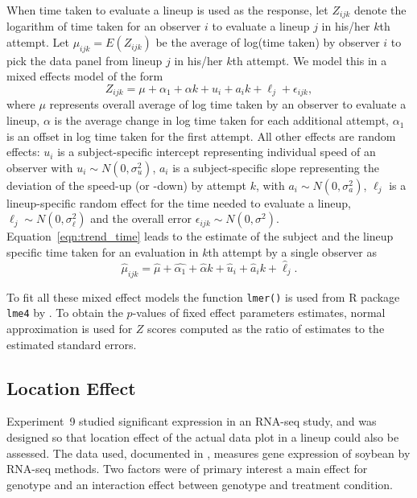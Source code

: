 \documentclass[10pt]{article}\usepackage[]{graphicx}\usepackage[]{color}
\newcommand{\hh}[1]{{\color{magenta} #1}}
\begin{document}
When time taken to evaluate a lineup is used as the response, let $Z_{ijk}$ denote the logarithm of time taken for an observer $i$ to evaluate a  lineup $j$ in his/her $k$th attempt. Let $\mu_{ijk}=  E(Z_{ijk})$ be the average of log(time taken) by  observer $i$ to pick the data panel from lineup $j$ in his/her $k$th attempt. We model this in a mixed effects model of the form
\begin{equation} \label{eqn:trend_time}
Z_{ijk} = \mu + \alpha_1 + \alpha k + u_i +  a_{i} k + \ell_j + \epsilon_{ijk},  
\end{equation}
where $\mu$ represents overall average of log time taken by an observer to evaluate a lineup, $\alpha$ is the average change in log time taken for each additional attempt,  $\alpha_1$ is an offset in log time taken for the first attempt. All other effects are random effects: $u_i$ is a subject-specific intercept representing individual speed of an observer with $u_i \sim N(0, \sigma_u^2)$, $a_i$ is a subject-specific slope representing the deviation of the speed-up (or -down) by attempt $k$, with $a_i \sim N(0, \sigma_a^2)$, $\ell_j$ is a lineup-specific random effect for the time needed to evaluate a lineup, $\ell_j \sim N(0, \sigma_\ell^2)$ and the overall error $\epsilon_{ijk} \sim N(0, \sigma^2)$.
Equation~\ref{eqn:trend_time} leads to the estimate of the subject and the lineup specific time taken for an evaluation in $k$th attempt by a single observer as 
\begin{equation} \label{eqn:trend_time_est}
\hat \mu_{ijk} =  \hat{\mu} + \hat{\alpha_1}+ \hat{\alpha}k + \hat{u}_i +  \hat{a}_i k + \hat{\ell}_j.
\end{equation}

To fit all these mixed effect models the function {\tt lmer()} is used from R package {\tt lme4} by \cite{lme4:2011}. To obtain the $p$-values of fixed effect parameters estimates, normal approximation is used for $Z$ scores computed as the ratio of estimates to the estimated standard errors.  

\subsection{Location Effect} \label{sec:location_design} Experiment~9 studied significant expression in an RNA-seq study, and was designed so that location effect of the actual data plot in a lineup could also be assessed. The data used, documented in \cite{atwood:2013}, measures gene expression of soybean by RNA-seq methods. Two factors were of primary interest a main effect for genotype and an interaction effect between genotype and treatment condition.
\end{document}
